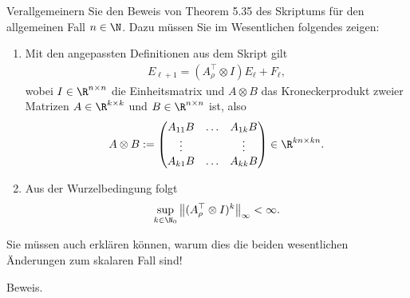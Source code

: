 \begin{exercise}
Verallgemeinern Sie den Beweis von Theorem 5.35 des Skriptums für den allgemeinen
Fall $n \in \N$. Dazu müssen Sie im Wesentlichen folgendes zeigen:
\begin{enumerate}[label = \textbf{\alph*)}]
  \item Mit den angepassten Definitionen aus dem Skript gilt
  \begin{align}
    E_{\ell + 1} = \left(A_{\rho}^{\top} \otimes I\right)E_{\ell} + F_{\ell},
  \end{align}
  wobei $I \in \R^{n \times n}$ die Einheitsmatrix und $A \otimes B$ das Kroneckerprodukt
  zweier Matrizen $A \in \R^{k \times k}$ und $B \in \R^{n \times n}$ ist, also
  \begin{align}
    A \otimes B := \begin{pmatrix}
      A_{11}B & \hdots & A_{1k}B \\
      \vdots & & \vdots \\
      A_{k1}B & \hdots & A_{kk}B
    \end{pmatrix}
    \in \R^{kn \times kn}.
  \end{align}
  \item Aus der Wurzelbedingung folgt
  \begin{align}
    \sup_{k \in \N_0} \left\| (A_{\rho}^{\top} \otimes I)^k\right\|_{\infty} < \infty.
  \end{align}
\end{enumerate}
Sie müssen auch erklären können, warum dies die beiden wesentlichen Änderungen
zum skalaren Fall sind!
\end{exercise}
\begin{solution}
Beweis.
\end{solution}
